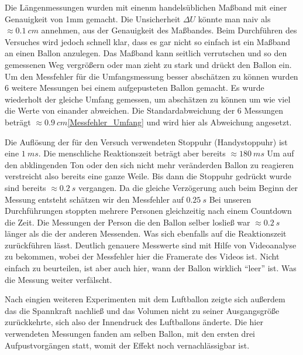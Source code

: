 \documentclass{article}
\begin{document}
            Die Längenmessungen wurden mit einenm handelsüblichen Maßband mit einer Genauigkeit von 1mm gemacht.
            Die Unsicherheit \( \Delta U \) könnte man naiv als \( \approx \SI{0.1}{cm} \) annehmen, aus der Genauigkeit des Maßbandes.
            Beim Durchführen des Versuches wird jedoch schnell klar, dass es gar nicht so einfach ist ein Maßband an einen Ballon anzulegen.
            Das Maßband kann seitlich verrutschen und so den gemessenen Weg vergrößern oder man zieht zu stark und drückt den Ballon ein.
            Um den Messfehler für die Umfangsmessung besser abschätzen zu können wurden
            6 weitere Messungen bei einem aufgepusteten Ballon gemacht.
            Es wurde wiederholt der gleiche Umfang gemessen, um abschätzen zu können um wie viel die Werte von einander abweichen.
            Die Standardabweichung der 6 Messungen beträgt \( \approx \SI{0.9}{cm}\)\ref{Messfehler_Umfang} und wird hier als Abweichung angesetzt.
            
            Die Auflösung der für den Versuch verwendeten Stoppuhr (Handystoppuhr) ist eine \(\SI{1}{ms}\).
            Die menschliche Reaktionszeit beträgt aber bereits \(\approx \SI{180}{ms} \)\cite{Reaktionszeit}
            Um auf den abklingenden Ton oder den sich nicht mehr veränderden Ballon zu reagieren verstreicht also bereits eine ganze Weile.
            Bis dann die Stoppuhr gedrückt wurde sind bereits \(\approx \SI{0.2}{s}\) vergangen.
            Da die gleiche Verzögerung auch beim Beginn der Messung entsteht schätzen wir den Messfehler auf \(\SI{0.25}{s}\)
            Bei unseren Durchführungen stoppten mehrere Personen gleichzeitig nach einem Countdown die Zeit. Die Messungen der
            Person die den Ballon selber losließ war \(\approx \SI{0.2}{s} \) länger als die der anderen Messenden.
            Was sich ebenfalls auf die Reaktionszeit zurückführen lässt.
            Deutlich genauere Messwerte sind mit Hilfe von Videoanalyse zu bekommen, wobei der Messfehler hier die Framerate des Videos ist.
            Nicht einfach zu beurteilen, ist aber auch hier, wann der Ballon wirklich \enquote{leer} ist. Was die Messung weiter verfälscht.

            Nach eingien weiteren Experimenten mit dem Luftballon zeigte sich außerdem das die Spannkraft nachließ und das Volumen
            nicht zu seiner Ausgangsgröße zurückkehrte, sich also der Innendruck des Luftballons änderte.
            Die hier verwendeten Messungen fanden am selben Ballon, mit den ersten drei Aufpustvorgängen statt, womit der Effekt noch vernachlässigbar ist.
\end{document}
